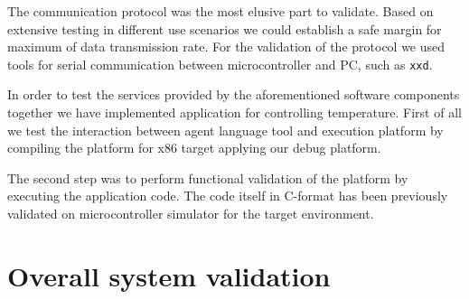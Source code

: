 \documentclass{scrreprt}
\begin{document}
The communication protocol was the most elusive part to validate.
Based on extensive testing in different use scenarios we could establish
a safe margin for maximum of data transmission rate.
For the validation of the protocol we used tools for serial communication
between microcontroller and PC, such as \texttt{xxd}.

In order to test the services provided by the aforementioned software components
together we have implemented application for controlling temperature.
First of all we test the interaction between agent language tool and execution platform
by compiling the platform for x86 target applying our debug platform.

The second step was to perform functional validation of the platform
by executing the application code. The code itself in C-format has been previously
validated on microcontroller simulator for the target environment.


\section{Overall system validation}
\end{document}
